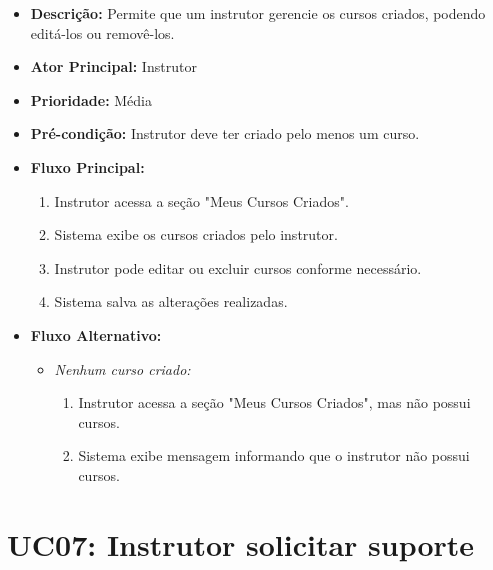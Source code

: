         \begin{itemize}
            \item \textbf{Descrição:} Permite que um instrutor gerencie os cursos criados, podendo editá-los ou removê-los.
            
            \item \textbf{Ator Principal:} Instrutor
            
            \item \textbf{Prioridade:} Média
            
            \item \textbf{Pré-condição:} Instrutor deve ter criado pelo menos um curso.
            
            \item \textbf{Fluxo Principal:}
            \begin{enumerate}
                \item Instrutor acessa a seção "Meus Cursos Criados".
                \item Sistema exibe os cursos criados pelo instrutor.
                \item Instrutor pode editar ou excluir cursos conforme necessário.
                \item Sistema salva as alterações realizadas.
            \end{enumerate}

            \item \textbf{Fluxo Alternativo:}
            \begin{itemize}
                \item \textit{Nenhum curso criado:}
                \begin{enumerate}
                    \item Instrutor acessa a seção "Meus Cursos Criados", mas não possui cursos.
                    \item Sistema exibe mensagem informando que o instrutor não possui cursos.
                \end{enumerate}
            \end{itemize}
        \end{itemize}

        \section*{UC07: Instrutor solicitar suporte}


